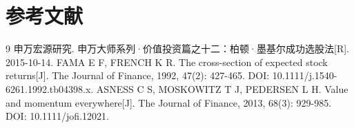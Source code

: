 
\chapter*{参考文献}
\begin{thebibliography}{9}
 申万宏源研究. 申万大师系列·价值投资篇之十二：柏顿·墨基尔成功选股法[R]. 2015-10-14.
 FAMA E F, FRENCH K R. The cross-section of expected stock returns[J]. The Journal of Finance, 1992, 47(2): 427-465. DOI: 10.1111/j.1540-6261.1992.tb04398.x.
 ASNESS C S, MOSKOWITZ T J, PEDERSEN L H. Value and momentum everywhere[J]. The Journal of Finance, 2013, 68(3): 929-985. DOI: 10.1111/jofi.12021.
\end{thebibliography}
